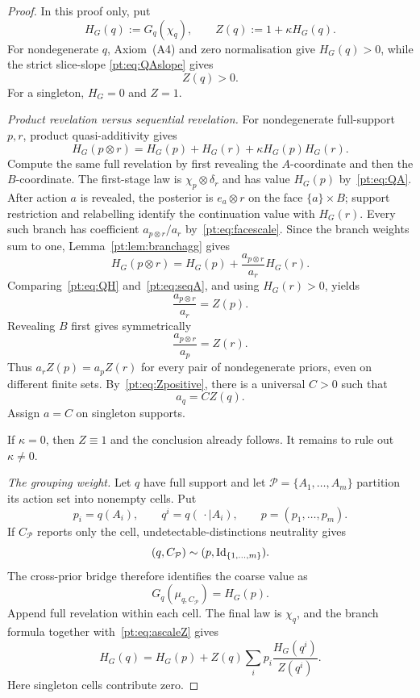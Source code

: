 \begin{proof}
In this proof only, put
\[
 H_G(q):=G_q(\chi_q),\qquad Z(q):=1+\kappa H_G(q).
\]
For nondegenerate $q$, Axiom~\textup{(A4)} and zero normalisation give
$H_G(q)>0$, while the strict slice-slope
\eqref{pt:eq:QAslope} gives
\begin{equation}
 Z(q)>0.
\label{pt:eq:Zpositive}
\end{equation}
For a singleton, $H_G=0$ and $Z=1$.

\emph{Product revelation versus sequential revelation.}
For nondegenerate full-support $p,r$, product quasi-additivity gives
\begin{equation}
 H_G(p\otimes r)
 =H_G(p)+H_G(r)+\kappa H_G(p)H_G(r).
\tag{QH}\label{pt:eq:QH}
\end{equation}
Compute the same full revelation by first revealing the $A$-coordinate and
then the $B$-coordinate.  The first-stage law is
$\chi_p\otimes\delta_r$ and has value $H_G(p)$ by~\eqref{pt:eq:QA}.
After action $a$ is revealed, the posterior is $e_a\otimes r$ on the face
$\{a\}\times B$; support restriction and relabelling identify the
continuation value with $H_G(r)$.  Every such branch has coefficient
$a_{p\otimes r}/a_r$ by~\eqref{pt:eq:facescale}.  Since the branch weights
sum to one, Lemma~\ref{pt:lem:branchagg} gives
\begin{equation}
 H_G(p\otimes r)=H_G(p)+\frac{a_{p\otimes r}}{a_r}H_G(r).
\tag{SA}\label{pt:eq:seqA}
\end{equation}
Comparing~\eqref{pt:eq:QH} and~\eqref{pt:eq:seqA}, and using
$H_G(r)>0$, yields
\[
 \frac{a_{p\otimes r}}{a_r}=Z(p).
\tag{R1}\label{pt:eq:ratio1}
\]
Revealing $B$ first gives symmetrically
\[
 \frac{a_{p\otimes r}}{a_p}=Z(r).
\tag{R2}\label{pt:eq:ratio2}
\]
Thus $a_rZ(p)=a_pZ(r)$ for every pair of nondegenerate priors, even on
different finite sets.  By~\eqref{pt:eq:Zpositive}, there is a universal
$C>0$ such that
\begin{equation}
 a_q=CZ(q).
\tag{AS}\label{pt:eq:ascaleZ}
\end{equation}
Assign $a=C$ on singleton supports.

If $\kappa=0$, then $Z\equiv1$ and the conclusion already follows.  It
remains to rule out $\kappa\ne0$.

\emph{The grouping weight.}
Let $q$ have full support and let
$\mathcal P=\{A_1,\ldots,A_m\}$ partition its action set into nonempty
cells.  Put
\[
 p_i=q(A_i),\qquad q^i=q(\,\cdot\mid A_i),\qquad
 p=(p_1,\ldots,p_m).
\]
If $C_{\mathcal P}$ reports only the cell, undetectable-distinctions
neutrality gives
\[
 (q,C_{\mathcal P})\sim(p,\operatorname{Id}_{\{1,\ldots,m\}}).
\]
The cross-prior bridge therefore identifies the coarse value as
\begin{equation}
 G_q(\mu_{q,C_{\mathcal P}})=H_G(p).
\tag{BG}\label{pt:eq:blockvalue}
\end{equation}
Append full revelation within each cell.  The final law is $\chi_q$, and the
branch formula together with~\eqref{pt:eq:ascaleZ} gives
\begin{equation}
 H_G(q)=H_G(p)+Z(q)\sum_i p_i\frac{H_G(q^i)}{Z(q^i)}.
\tag{GR}\label{pt:eq:groupingH}
\end{equation}
Here singleton cells contribute zero.


\end{proof}
